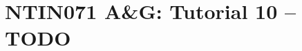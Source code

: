 \documentclass[a4paper,12pt]{amsart}
\begin{document}

\section*{NTIN071 A\&G: Tutorial 10 -- TODO}


\medskip


\medskip
\end{document}
